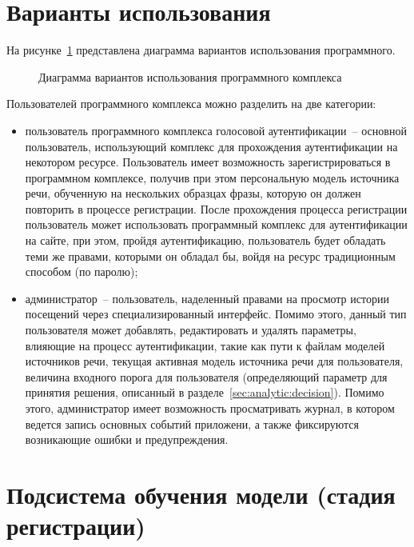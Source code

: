 \section{Варианты использования}

На рисунке~\ref{fig:use_cases} представлена диаграмма вариантов использования программного.

\begin{figure}[ht!]
    \caption{Диаграмма вариантов использования программного комплекса}
    \label{fig:use_cases}
\end{figure}

Пользователей программного комплекса можно разделить на две категории:
\begin{itemize}
\item пользователь программного комплекса голосовой аутентификации~-- основной пользователь, использующий
комплекс для прохождения аутентификации на некотором ресурсе. Пользователь имеет
возможность зарегистрироваться в программном комплексе, получив при этом персональную модель
источника речи, обученную на нескольких образцах фразы, которую он должен
повторить в процессе регистрации. После прохождения процесса регистрации
пользователь может использовать программный комплекс для аутентификации на сайте, при этом,
пройдя аутентификацию, пользователь будет обладать теми же правами, которыми он
обладал бы, войдя на ресурс традиционным способом (по паролю);
\item администратор~-- пользователь, наделенный правами на просмотр истории посещений через специализированный интерфейс. Помимо этого, данный тип пользователя может добавлять, редактировать и удалять параметры, влияющие на процесс аутентификации, такие как пути к файлам моделей источников речи, текущая активная модель источника речи для пользователя, величина входного порога для пользователя (определяющий параметр для принятия решения, описанный в разделе~\ref{sec:analytic:decision}). Помимо этого, администратор имеет возможность просматривать журнал, в котором ведется запись основных событий приложени, а также фиксируются возникающие ошибки и предупреждения.
\end{itemize}

\section{Подсистема обучения модели (стадия регистрации)}
\label{sec:construct:enrollment}

